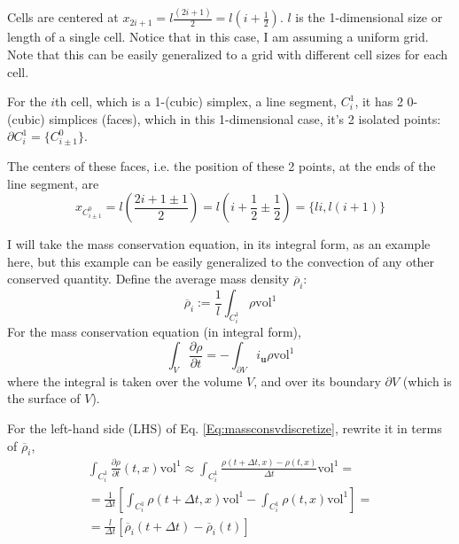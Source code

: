 \documentclass[10pt, landscape]{amsart}
\begin{document}
Cells are centered at $x_{2i+1} = l \frac{ (2i+1)}{2} = l(i + \frac{1}{2})$.  $l$ is the 1-dimensional size or length of a single cell.  Notice that in this case, I am assuming a uniform grid.  Note that this can be easily generalized to a grid with different cell sizes for each cell.  

For the $i$th cell, which is a 1-(cubic) simplex, a line segment, $C_i^1$, it has 2 $0$-(cubic) simplices (faces), which in this 1-dimensional case, it's 2 isolated points: $\partial C_i^1 = \lbrace C^0_{i \pm 1} \rbrace$.

The centers of these faces, i.e. the position of these 2 points, at the ends of the line segment, are
\[
x_{C^0_{i \pm 1} } = l \left( \frac{2i  +1 \pm 1 }{2} \right) = l ( i + \frac{1}{2} \pm \frac{1}{2} ) = \lbrace li, l(i+1) \rbrace
\]

I will take the mass conservation equation, in its integral form, as an example here, but this example can be easily generalized to the convection of any other conserved quantity.  Define the average mass density $\overline{\rho}_i$:
\begin{equation}
  \overline{\rho}_i := \frac{1}{l} \int_{C_i^1} \rho \text{vol}^1
\end{equation}
For the mass conservation equation (in integral form),
\begin{equation}\label{Eq:massconsvdiscretize}
\int_V  \frac{ \partial \rho}{ \partial t} = - \int_{\partial V} i_{\mathbf{u}}\rho \text{vol}^1
  \end{equation}
where the integral is taken over the volume $V$, and over its boundary $\partial V$ (which is the surface of $V$).

For the left-hand side (LHS) of Eq. \ref{Eq:massconsvdiscretize}, rewrite it in terms of $\overline{\rho}_i$,
\[
\begin{gathered}
  \int_{C_i^1} \frac{  \partial \rho}{ \partial t}(t,x) \text{vol}^1 \approx \int_{C_i^1} \frac{ \rho(t+\Delta t, x) - \rho(t,x) }{ \Delta t} \text{vol}^1 = \\
  = \frac{1}{ \Delta t} \left[ \int_{C_i^1} \rho(t+\Delta t,x) \text{vol}^1 - \int_{C_i^1} \rho(t,x) \text{vol}^1 \right] = \\
  = \frac{l}{\Delta t} \left[ \overline{\rho}_i(t+\Delta t) - \overline{\rho}_i(t) \right]
  \end{gathered}
\]
\end{document}
